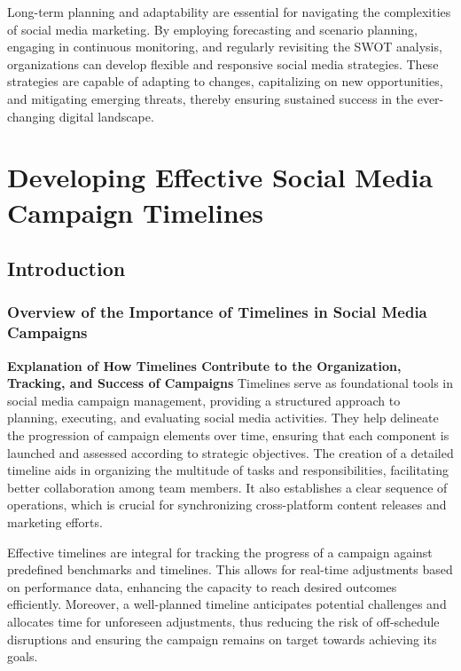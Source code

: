 \documentclass[
]{book}
\begin{document}
Long-term planning and adaptability are essential for navigating the complexities of social media marketing. By employing forecasting and scenario planning, engaging in continuous monitoring, and regularly revisiting the SWOT analysis, organizations can develop flexible and responsive social media strategies. These strategies are capable of adapting to changes, capitalizing on new opportunities, and mitigating emerging threats, thereby ensuring sustained success in the ever-changing digital landscape.

\hypertarget{developing-effective-social-media-campaign-timelines}{%
\chapter{Developing Effective Social Media Campaign Timelines}\label{developing-effective-social-media-campaign-timelines}}

\hypertarget{introduction-2}{%
\section{Introduction}\label{introduction-2}}

\hypertarget{overview-of-the-importance-of-timelines-in-social-media-campaigns}{%
\subsection*{Overview of the Importance of Timelines in Social Media Campaigns}\label{overview-of-the-importance-of-timelines-in-social-media-campaigns}}

\textbf{Explanation of How Timelines Contribute to the Organization, Tracking, and Success of Campaigns}
Timelines serve as foundational tools in social media campaign management, providing a structured approach to planning, executing, and evaluating social media activities. They help delineate the progression of campaign elements over time, ensuring that each component is launched and assessed according to strategic objectives. The creation of a detailed timeline aids in organizing the multitude of tasks and responsibilities, facilitating better collaboration among team members. It also establishes a clear sequence of operations, which is crucial for synchronizing cross-platform content releases and marketing efforts.

Effective timelines are integral for tracking the progress of a campaign against predefined benchmarks and timelines. This allows for real-time adjustments based on performance data, enhancing the capacity to reach desired outcomes efficiently. Moreover, a well-planned timeline anticipates potential challenges and allocates time for unforeseen adjustments, thus reducing the risk of off-schedule disruptions and ensuring the campaign remains on target towards achieving its goals.
\end{document}
